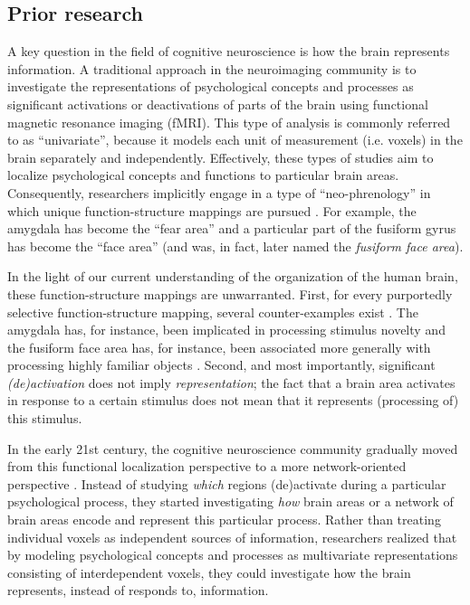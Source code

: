 \documentclass[12pt,a4paper]{article}\usepackage[]{graphicx}\usepackage[]{color}
\begin{document}
\subsection{Prior research}
A key question in the field of cognitive neuroscience is how the brain represents information. A traditional approach in the neuroimaging community is to investigate the representations of psychological concepts and processes as significant activations or deactivations of parts of the brain using functional magnetic resonance imaging (fMRI). This type of analysis is commonly referred to as ``univariate'', because it models each unit of measurement (i.e. voxels) in the brain separately and independently. Effectively, these types of studies aim to localize psychological concepts and functions to particular brain areas. Consequently, researchers implicitly engage in a type of ``neo-phrenology'' in which unique function-structure mappings are pursued \citep{poldrack2010}. For example, the amygdala has become the ``fear area'' \citep{ledoux2003} and a particular part of the fusiform gyrus has become the ``face area'' (and was, in fact, later named the \emph{fusiform face area}).  

In the light of our current understanding of the organization of the human brain, these function-structure mappings are unwarranted. First, for every purportedly selective function-structure mapping, several counter-examples exist \citep{poldrack2010}. The amygdala has, for instance, been implicated in processing stimulus novelty \citep{blackford2010} and the fusiform face area has, for instance, been associated more generally with processing highly familiar objects \citep{tarr2000}. Second, and most importantly, significant \emph{(de)activation} does not imply \emph{representation}; the fact that a brain area activates in response to a certain stimulus does not mean that it represents (processing of) this stimulus.   

In the early 21st century, the cognitive neuroscience community gradually moved from this functional localization perspective to a more network-oriented perspective \citep{sporns2002,barrett2013}. Instead of studying \emph{which} regions (de)activate during a particular psychological process, they started investigating \emph{how} brain areas or a network of brain areas encode and represent this particular process. Rather than treating individual voxels as independent sources of information, researchers realized that by modeling psychological concepts and processes as multivariate representations consisting of interdependent voxels, they could investigate how the brain represents, instead of responds to, information.
\end{document}
